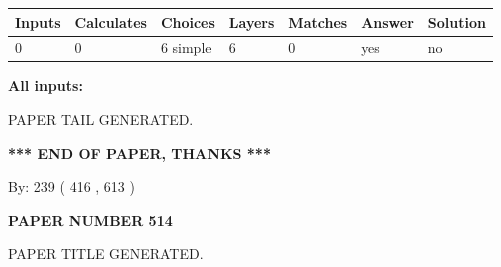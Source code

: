 \documentclass{ctexart}
\begin{document}
 
   
   
   
   
\noindent\begin{tabular}{|l|l|l|l|l|l|l|}
 \hline
Inputs & Calculates & Choices & Layers & Matches & Answer & Solution \\ \hline
 0  & 
 0  & 
 6
  simple  
  & 
 6  & 
 0  & 
  yes & 
  no 
  \\ \hline
 \end{tabular}
   
   
   
   
\noindent{}
   
   
   
   
\noindent\vspace{0.1in}\hspace{-0.08in} {\textbf{\Large{All inputs: }}}
   
   
   
   
   
   
 \vspace{0.2in}
 
   
   
\vspace{2.0in} PAPER TAIL GENERATED.
   
   
   
   
\vspace{1.0in} 
{\textbf{\large{ *** END OF PAPER, THANKS *** }}} 
   
   
\hspace{1.0in} By: 
 239 ( 416 ,  613 )
   
   
   
   
\newpage 
\setcounter{page}{ 
   514001 } 
   
   
   
   
 {\textbf{ \Large{ PAPER NUMBER  514  }}}
   
   
\vspace{0.2in}
   
   
   
   
   
   
   
   
 \vspace{0.2in}
 
 
 
 
   
   
 PAPER TITLE GENERATED.
   
\end{document}
